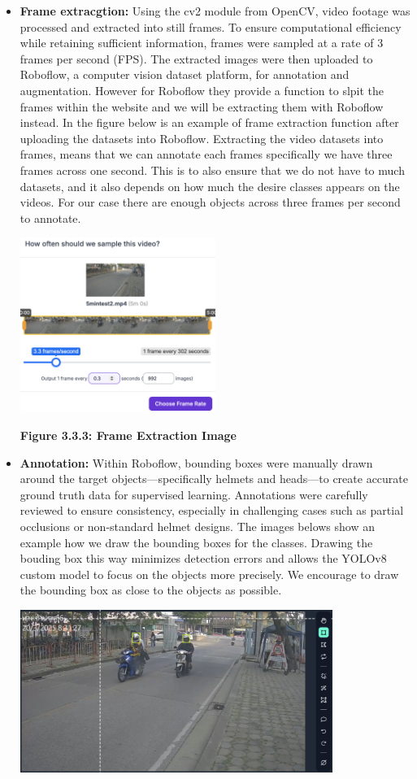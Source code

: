 \begin{itemize}
	\item \textbf{Frame extracgtion:} Using the cv2 module from OpenCV, video footage was processed and extracted into still frames. To ensure computational efficiency while retaining sufficient information, frames were sampled at a rate of 3 frames per second (FPS). The extracted images were then uploaded to Roboflow, a computer vision dataset platform, for annotation and augmentation. However for Roboflow they provide a function to slpit the frames within the website and we will be extracting them with Roboflow instead. In the figure below is an example of frame extraction function after uploading the datasets into Roboflow. Extracting the video datasets into frames, means that we can annotate each frames specifically we have three frames across one second. This is to also ensure that we do not have to much datasets, and it also depends on how much the desire classes appears on the videos. For our case there are enough objects across three frames per second to annotate.
	\begin{center}
		\includegraphics[width=0.5\textwidth]{Frameex.png}
		
		\vspace{0.5em}
		\textbf{Figure 3.3.3: Frame Extraction Image}
	\end{center}
	
	\item\textbf{Annotation:} Within Roboflow, bounding boxes were manually drawn around the target objects—specifically helmets and heads—to create accurate ground truth data for supervised learning. Annotations were carefully reviewed to ensure consistency, especially in challenging cases such as partial occlusions or non-standard helmet designs. The images belows show an example how we draw the bounding boxes for the classes. Drawing the bouding box this way minimizes detection errors and allows the YOLOv8 custom model to focus on the objects more precisely. We encourage to draw the bounding box as close to the objects as possible.
		\begin{center}
		\includegraphics[width=0.8\textwidth]{Anotate.png}
		

\end{center}
\end{itemize}
